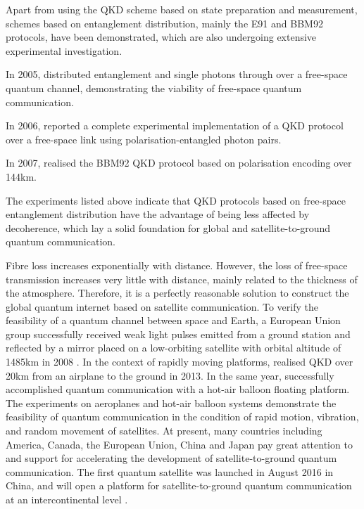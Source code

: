 Apart from using the QKD scheme based on state preparation and measurement, schemes based on entanglement distribution, mainly the E91 \cite{bib:PRL_67_661} and BBM92 \cite{bib:PRL_68_557} protocols, have been demonstrated, which are also undergoing extensive experimental investigation.

In 2005, \cite{bib:OE_13_202} distributed entanglement and single photons through over a free-space quantum channel, demonstrating the viability of free-space quantum communication. 

In 2006, \cite{bib:APL_89_101122} reported a complete experimental implementation of a QKD protocol over a free-space link using polarisation-entangled photon pairs.

In 2007, \cite{bib:NP_3_481} realised the BBM92 QKD protocol based on polarisation encoding over 144km.

The experiments listed above indicate that QKD protocols based on free-space entanglement distribution have the advantage of being less affected by decoherence, which lay a solid foundation for global and satellite-to-ground quantum communication.

Fibre loss increases exponentially with distance. However, the loss of free-space transmission increases very little with distance,  mainly related to the thickness of the atmosphere. Therefore, it is a perfectly reasonable solution to construct the global quantum internet based on satellite communication. To verify the feasibility of a quantum channel between space and Earth, a European Union group successfully received weak light pulses emitted from a ground station and reflected by a mirror placed on a low-orbiting satellite with orbital altitude of 1485km in 2008 \cite{bib:NJP_10_033038}. In the context of rapidly moving platforms, \cite{bib:NP_7_382} realised QKD over 20km from an airplane to the ground in 2013. In the same year, \cite{bib:NP_7_387} successfully accomplished quantum communication with a hot-air balloon floating platform. The experiments on aeroplanes and hot-air balloon systems demonstrate the feasibility of quantum communication in the condition of rapid motion, vibration, and random movement of satellites. At present, many countries including America, Canada, the European Union, China and Japan pay great attention to and support for accelerating the development of satellite-to-ground quantum communication. The first quantum satellite was launched in August 2016 in China, and will open a platform for satellite-to-ground quantum communication at an intercontinental level \cite{bib:N_535_478}.

